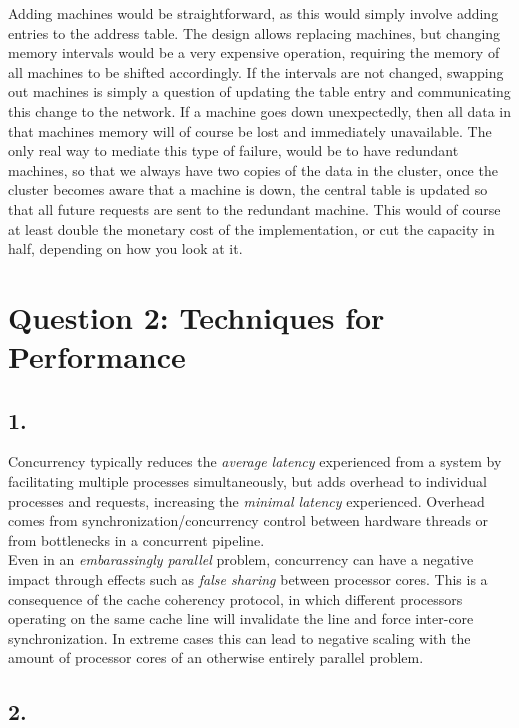 \documentclass[12pt]{article}
\begin{document}
Adding machines would be straightforward, as this would simply involve adding entries to the address table. The design allows replacing machines, but changing memory intervals would be a very expensive operation, requiring the memory of all machines to be shifted accordingly. If the intervals are not changed, swapping out machines is simply a question of updating the table entry and communicating this change to the network. If a machine goes down unexpectedly, then all data in that machines memory will of course be lost and immediately unavailable. The only real way to mediate this type of failure, would be to have redundant machines, so that we always have two copies of the data in the cluster, once the cluster becomes aware that a machine is down, the central table is updated so that all future requests are sent to the redundant machine. This would of course at least double the monetary cost of the implementation, or cut the capacity in half, depending on how you look at it.

\section*{Question 2: Techniques for Performance}

\subsection*{1.} %

Concurrency typically reduces the \emph{average latency} experienced from a system by facilitating multiple processes simultaneously, but adds overhead to individual processes and requests, increasing the \emph{minimal latency} experienced. Overhead comes from synchronization/concurrency control between hardware threads or from bottlenecks in a concurrent pipeline. \\
Even in an \emph{embarassingly parallel} problem, concurrency can have a negative impact through effects such as \emph{false sharing} between processor cores. This is a consequence of the cache coherency protocol, in which different processors operating on the same cache line will invalidate the line and force inter-core synchronization. In extreme cases this can lead to negative scaling with the amount of processor cores of an otherwise entirely parallel problem.

\subsection*{2.} %
\end{document}
